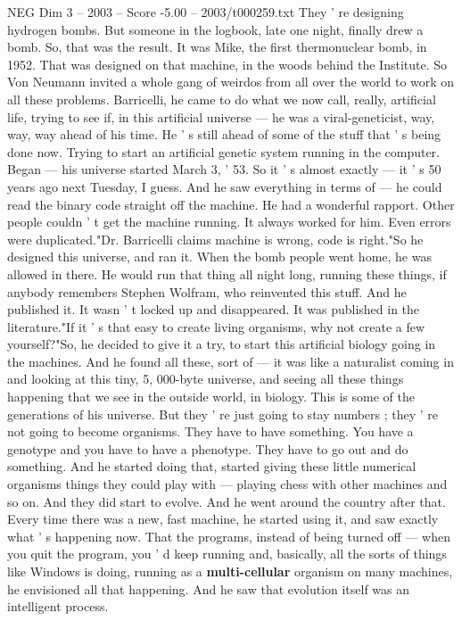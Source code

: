 \begin{textsample}{NEG Dim 3 – 2003 – Score -5.00 – 2003/t000259.txt}
They ' re designing hydrogen bombs.
But someone in the logbook, late one night, finally drew a bomb.
So, that was the result.
It was Mike, the first thermonuclear bomb, in 1952.
That was designed on that machine, in the woods behind the Institute.
So Von Neumann invited a whole gang of weirdos from all over the world to work on all these problems.
Barricelli, he came to do what we now call, really, artificial life, trying to see if, in this artificial universe — he was a viral-geneticist, way, way, way ahead of his time.
He ' s still ahead of some of the stuff that ' s being done now.
Trying to start an artificial genetic system running in the computer.
Began — his universe started March 3, ' 53.
So it ' s almost exactly — it ' s 50 years ago next Tuesday, I guess.
And he saw everything in terms of — he could read the binary code straight off the machine.
He had a wonderful rapport.
Other people couldn ' t get the machine running.
It always worked for him.
Even errors were duplicated."Dr.
Barricelli claims machine is wrong, code is right."So he designed this universe, and ran it.
When the bomb people went home, he was allowed in there.
He would run that thing all night long, running these things, if anybody remembers Stephen Wolfram, who reinvented this stuff.
And he published it.
It wasn ' t locked up and disappeared.
It was published in the literature."If it ' s that easy to create living organisms, why not create a few yourself?"So, he decided to give it a try, to start this artificial biology going in the machines.
And he found all these, sort of — it was like a naturalist coming in and looking at this tiny, 5, 000-byte universe, and seeing all these things happening that we see in the outside world, in biology.
This is some of the generations of his universe.
But they ' re just going to stay numbers ; they ' re not going to become organisms.
They have to have something.
You have a genotype and you have to have a phenotype.
They have to go out and do something.
And he started doing that, started giving these little numerical organisms things they could play with — playing chess with other machines and so on.
And they did start to evolve.
And he went around the country after that.
Every time there was a new, fast machine, he started using it, and saw exactly what ' s happening now.
That the programs, instead of being turned off — when you quit the program, you ' d keep running and, basically, all the sorts of things like Windows is doing, running as a \textbf{multi-cellular} organism on many machines, he envisioned all that happening.
And he saw that evolution itself was an intelligent process.

\end{textsample}
